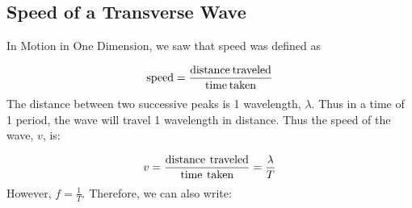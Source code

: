 \begin{definition}
    \noindent
      \label{m38806*uid21}
            \subsection{ Speed of a Transverse Wave}
            \nopagebreak
        \label{m38806*id319670}In Motion in One Dimension, we saw that speed was defined as\par 
        \label{m38806*id319676}\nopagebreak\noindent{}
    \begin{equation}
    \mathrm{speed}=\frac{\mathrm{distance}\phantom{\rule{2pt}{0ex}}\mathrm{traveled}}{\mathrm{time}\phantom{\rule{2pt}{0ex}}\mathrm{taken}}
      \end{equation}
        \label{m38806*id319706}The distance between two successive peaks is 1 wavelength, $\lambda $. Thus in a time of 1 period, the wave will travel 1 wavelength in distance. Thus the speed of the wave, $v$, is:\par 
        \label{m38806*id319732}\nopagebreak\noindent{}
    \begin{equation}
    v=\frac{\text{distance}\phantom{\rule{4.pt}{0ex}}\text{traveled}}{\text{time}\phantom{\rule{4.pt}{0ex}}\text{taken}}=\frac{\lambda }{T}
      \end{equation}
        \label{m38806*id319776}However, $f=\frac{1}{T}$. Therefore, we can also write:\par 
        \label{m38806*id319802}\nopagebreak\noindent{}
          

\end{definition}
